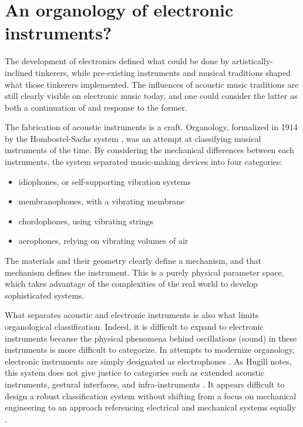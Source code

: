 \section{An organology of electronic instruments?}  

The development of electronics defined what could be done by artistically-inclined tinkerers, while pre-existing instruments and musical traditions shaped what those tinkerers implemented. The influences of acoustic music traditions are still clearly visible on electronic music today, and one could consider the latter as both a continuation of and response to the former. 

The fabrication of acoustic instruments is a craft. Organology, formalized in 1914 by the Hombostel-Sachs system \cite{von1961}, was an attempt at classifying musical instruments of the time. By considering the mechanical differences between each instruments, the system separated music-making devices into four categories: 

\begin{itemize}
	\item idiophones, or self-supporting vibration systems
	\item membranophones, with a vibrating membrane
	\item chordophones, using vibrating strings
	\item aerophones, relying on vibrating volumes of air
\end{itemize}

The materials and their geometry clearly define a mechanism, and that mechanism defines the instrument. This is a purely physical parameter space, which takes advantage of the complexities of the real world to develop sophisticated systems. 

What separates acoustic and electronic instruments is also what limits organological classification. Indeed, it is difficult to expand to electronic instruments because the physical phenomena behind oscillations (sound) in these instruments is more difficult to categorize. In attempts to modernize organology, electronic instruments are simply designated as electrophones \cite{hugill2012}. As Hugill notes, this system does not give justice to categories such as extended acoustic instruments, gestural interfaces, and infra-instruments \cite{bowers2005}. It appears difficult to design a robust classification system without shifting from a focus on mechanical engineering to an approach referencing electrical and mechanical systems equally \cite{haslett2005}. 

